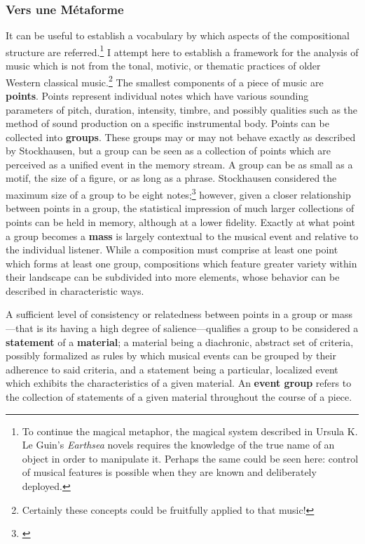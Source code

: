 \subsubsection{Vers une Métaforme}

It can be useful to establish a vocabulary by which aspects of the compositional structure are referred.\footnote{To continue the magical metaphor, the magical system described in Ursula K. Le Guin's \textit{Earthsea} novels requires the knowledge of the true name of an object in order to manipulate it. Perhaps the same could be seen here: control of musical features is possible when they are known and deliberately deployed.} I attempt here to establish a framework for the analysis of music which is not from the tonal, motivic, or thematic practices of older Western classical music.\footnote{Certainly these concepts could be fruitfully applied to that music!} The smallest components of a piece of music are \textbf{points}. Points represent individual notes which have various sounding parameters of pitch, duration, intensity, timbre, and possibly qualities such as the method of sound production on a specific instrumental body. Points can be collected into \textbf{groups}. These groups may or may not behave exactly as described by Stockhausen, but a group can be seen as a collection of points which are perceived as a unified event in the memory stream. A group can be as small as a motif, the size of a figure, or as long as a phrase. Stockhausen considered the maximum size of a group to be eight notes;\footnote{\citet[40]{stockhausen}} however, given a closer relationship between points in a group, the statistical impression of much larger collections of points can be held in memory, although at a lower fidelity. Exactly at what point a group becomes a \textbf{mass} is largely contextual to the musical event and relative to the individual listener. While a composition must comprise at least one point which forms at least one group, compositions which feature greater variety within their landscape can be subdivided into more elements, whose behavior can be described in characteristic ways. %

A sufficient level of consistency or relatedness between points in a group or mass—that is its having a high degree of salience—qualifies a group to be considered a \textbf{statement} of a \textbf{material}; a material being a diachronic, abstract set of criteria, possibly formalized as rules by which musical events can be grouped by their adherence to said criteria, and a statement being a particular, localized event which exhibits the characteristics of a given material. An \textbf{event group} refers to the collection of statements of a given material throughout the course of a piece. 

